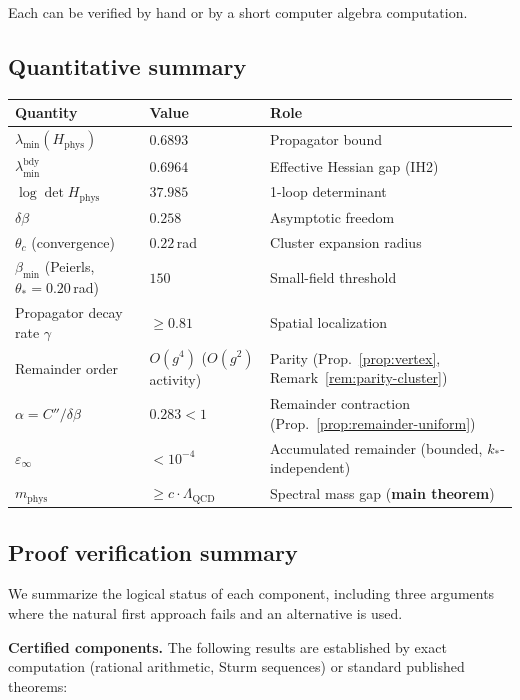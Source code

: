 \documentclass[11pt]{article}
\theoremstyle{definition}
\newcommand{\Lam}{\Lambda_{\mathrm{QCD}}}
\begin{document}
Each can be verified by hand or by a short computer algebra
computation.

\subsection{Quantitative summary}

\begin{center}
\begin{tabular}{lll}
\toprule
\textbf{Quantity} & \textbf{Value} & \textbf{Role}\\
\midrule
$\lambda_{\min}(H_{\mathrm{phys}})$ & $0.6893$ & Propagator bound\\
$\lambda_{\min}^{\mathrm{bdy}}$ & $0.6964$ & Effective Hessian gap (IH2)\\
$\log\det H_{\mathrm{phys}}$ & $37.985$ & 1-loop determinant\\
$\delta\beta$ & $0.258$ & Asymptotic freedom\\
$\theta_c$ (convergence) & $0.22$\,rad & Cluster expansion radius\\
$\beta_{\min}$ (Peierls, $\theta_*{=}0.20$\,rad) & $150$ &
Small-field threshold\\
Propagator decay rate $\gamma$ & $\ge 0.81$ & Spatial localization\\
Remainder order & $O(g^4)$ ($O(g^2)$ activity) & Parity (Prop.~\ref{prop:vertex},
Remark~\ref{rem:parity-cluster})\\
$\alpha=C''/\delta\beta$ & $0.283<1$ &
Remainder contraction (Prop.~\ref{prop:remainder-uniform})\\
$\varepsilon_\infty$ & $<10^{-4}$ &
Accumulated remainder (bounded, $k_*$-independent)\\
$m_{\mathrm{phys}}$ & $\ge c\cdot\Lam$ &
Spectral mass gap (\textbf{main theorem})\\
\bottomrule
\end{tabular}
\end{center}

\subsection{Proof verification summary}%
\label{subsec:audit}

We summarize the logical status of each component, including
three arguments where the natural first approach fails and
an alternative is used.

\medskip\noindent\textbf{Certified components.}
The following results are established by exact computation
(rational arithmetic, Sturm sequences) or standard published
theorems:
\end{document}

